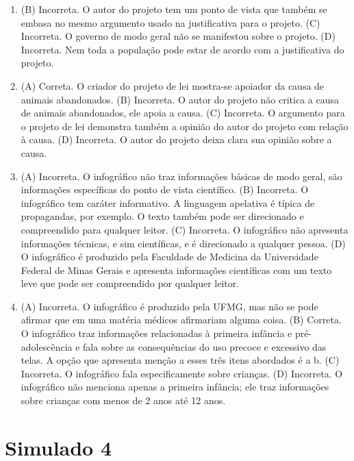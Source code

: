 \begin{enumerate}
\item (B)
  Incorreta. O autor do projeto tem um ponto de vista que também se
  embasa no mesmo argumento usado na justificativa para o projeto.
(C)
  Incorreta. O governo de modo geral não se manifestou sobre o projeto.
(D)
  Incorreta. Nem toda a população pode estar de acordo com a
  justificativa do projeto.

\item (A) Correta. O criador do projeto de lei mostra-se apoiador da causa de
animais abandonados.
(B) Incorreta. O autor do projeto não critica a causa de animais
abandonados, ele apoia a causa.
(C) Incorreta. O argumento para o projeto de lei demonstra também a
opinião do autor do projeto com relação à causa.
(D) Incorreta. O autor do projeto deixa clara sua opinião sobre a causa.

\item (A) Incorreta. O infográfico não traz informações básicas de modo geral,
são informações específicas do ponto de vista científico.
(B) Incorreta. O infográfico tem caráter informativo. A linguagem
apelativa é típica de propagandas, por exemplo. O texto também pode ser
direcionado e compreendido para qualquer leitor.
(C) Incorreta. O infográfico não apresenta informações técnicas, e sim
científicas, e é direcionado a qualquer pessoa.
(D) O infográfico é produzido pela Faculdade de Medicina da Universidade
Federal de Minas Gerais e apresenta informações científicas com um texto
leve que pode ser compreendido por qualquer leitor.

\item (A) Incorreta. O infográfico é produzido pela UFMG, mas não se pode
afirmar que em uma matéria médicos afirmariam alguma coisa.
(B) Correta. O infográfico traz informações relacionadas à primeira
infância e pré-adolescência e fala sobre as consequências do uso precoce
e excessivo das telas. A opção que apresenta menção a esses três itens
abordados é a b.
(C) Incorreta. O infográfico fala especificamente sobre crianças.
(D) Incorreta. O infográfico não menciona apenas a primeira infância; ele
traz informações sobre crianças com menos de 2 anos até 12 anos.
\end{enumerate}

\section*{Simulado 4}


